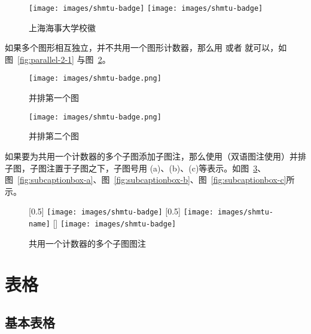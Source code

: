 \begin{figure}[!htp]
  \centering
  \texttt{[image: images/shmtu-badge]}
  \hspace{1cm}
  \texttt{[image: images/shmtu-badge]}
  \caption{上海海事大学校徽}
  \label{fig:parallel-1}
\end{figure}

如果多个图形相互独立，并不共用一个图形计数器，那么用  或者 就可以，如图~\ref{fig:parallel-2-1} 与图~\ref{fig:parallel-2-2}。

\begin{figure}[!htp]
  \begin{minipage}{0.48\textwidth}
  	\centering
    \texttt{[image: images/shmtu-badge.png]}
    \caption{并排第一个图}
    \label{fig:parallel-2-1}
  \end{minipage}
  \hfill
  \begin{minipage}{0.48\textwidth}
    \centering
    \texttt{[image: images/shmtu-badge.png]}
    \caption{并排第二个图}
    \label{fig:parallel-2-2}
  \end{minipage}
\end{figure}

如果要为共用一个计数器的多个子图添加子图注，那么使用（双语图注使用）并排子图，子图注置于子图之下，子图号用 (a)、(b)、(c)等表示。如图~\ref{fig:subcaptionbox}、图~\ref{fig:subcaptionbox-a}、图~\ref{fig:subcaptionbox-b}、图~\ref{fig:subcaptionbox-c}所示。

\begin{figure}[!htp]
	[0.5\textwidth]{%
	  \texttt{[image: images/shmtu-badge]}
	}
  \hfill
    [0.5\textwidth]{%
	  \texttt{[image: images/shmtu-name]}
	}
  \hfill
    [\textwidth]{%
	  \texttt{[image: images/shmtu-badge]}
  }
  \caption{共用一个计数器的多个子图图注}
  \label{fig:subcaptionbox}
\end{figure}

\section{表格}

\subsection{基本表格}

